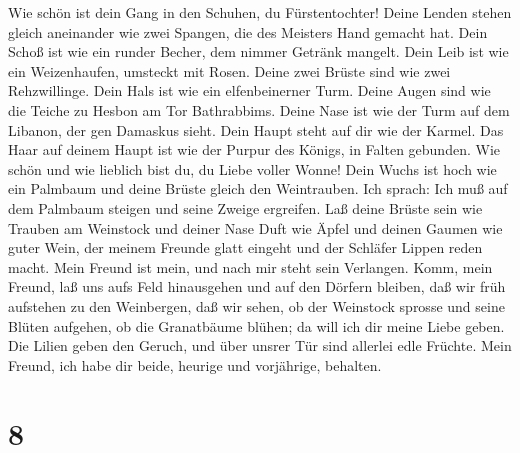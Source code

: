  Wie schön ist dein Gang in den Schuhen, du Fürstentochter!
Deine Lenden stehen gleich aneinander wie zwei Spangen, die des Meisters
Hand gemacht hat.  Dein Schoß ist wie ein runder Becher, dem
nimmer Getränk mangelt. Dein Leib ist wie ein Weizenhaufen, umsteckt mit
Rosen.  Deine zwei Brüste sind wie zwei Rehzwillinge.
 Dein Hals ist wie ein elfenbeinerner Turm. Deine Augen sind
wie die Teiche zu Hesbon am Tor Bathrabbims. Deine Nase ist wie der Turm
auf dem Libanon, der gen Damaskus sieht.  Dein Haupt steht
auf dir wie der Karmel. Das Haar auf deinem Haupt ist wie der Purpur des
Königs, in Falten gebunden.  Wie schön und wie lieblich bist
du, du Liebe voller Wonne!  Dein Wuchs ist hoch wie ein
Palmbaum und deine Brüste gleich den Weintrauben.  Ich
sprach: Ich muß auf dem Palmbaum steigen und seine Zweige ergreifen. Laß
deine Brüste sein wie Trauben am Weinstock und deiner Nase Duft wie
Äpfel  und deinen Gaumen wie guter Wein, der meinem Freunde
glatt eingeht und der Schläfer Lippen reden macht.  Mein
Freund ist mein, und nach mir steht sein Verlangen.  Komm,
mein Freund, laß uns aufs Feld hinausgehen und auf den Dörfern bleiben,
 daß wir früh aufstehen zu den Weinbergen, daß wir sehen,
ob der Weinstock sprosse und seine Blüten aufgehen, ob die Granatbäume
blühen; da will ich dir meine Liebe geben.  Die Lilien
geben den Geruch, und über unsrer Tür sind allerlei edle Früchte. Mein
Freund, ich habe dir beide, heurige und vorjährige, behalten.

\hypertarget{section-7}{%
\section{8}\label{section-7}}

